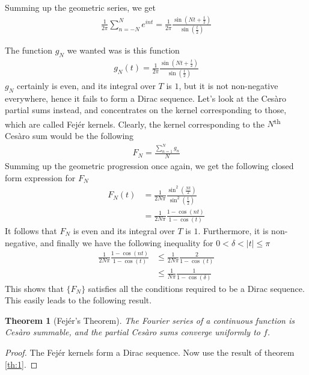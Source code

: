 \documentclass[12pt, titlepage]{article}
\newtheorem{thm}{Theorem}[section]
\theoremstyle{definition}
\begin{document}
Summing up the geometric series, we get
\begin{align*}
    \frac{1}{2\pi} \sum_{n = -N}^{N} e^{int} = \frac{1}{2\pi} \frac{\sin\left( Nt + \frac{t}{2} \right)}{\sin\left( \frac{t}{2} \right)}
\end{align*}

The function $g_N$ we wanted was is this function
\begin{align}
    g_N(t) = \frac{1}{2\pi} \frac{\sin\left( Nt + \frac{t}{2} \right)}{\sin\left( \frac{t}{2} \right)} \label{eq:5}
\end{align}
$g_N$ certainly is even, and its integral over $T$ is $1$, but it is not non-negative everywhere, hence it fails to form a Dirac sequence. Let's look at the Cesàro partial sums instead, and concentrates on the kernel corresponding to those, which are called Fejér kernels. Clearly, the kernel corresponding to the $N$\textsuperscript{th} Cesàro sum would be the following
\begin{align*}
    F_N = \frac{\sum_{n=1}^{N} g_n}{N} 
\end{align*}
Summing up the geometric progression once again, we get the following closed form expression for $F_N$
\begin{align*}
    F_N(t) &= \frac{1}{2N\pi} \frac{\sin^2 \left( \frac{Nt}{2} \right)}{\sin^2 \left( \frac{t}{2} \right)} \\
    & = \frac{1}{2N\pi} \frac{1 - \cos(nt)}{1 - \cos(t)}
\end{align*}
It follows that $F_N$ is even and its integral over $T$ is $1$. Furthermore, it is non-negative, and finally we have the following inequality for $0 < \delta < |t| \leq \pi$
\begin{align*}
    \frac{1}{2N\pi} \frac{1 - \cos(nt)}{1 - \cos(t)} &\leq \frac{1}{2N\pi} \frac{2}{1 - \cos(t)} \\
    &\leq \frac{1}{N\pi} \frac{1}{1 - \cos(\delta)}
\end{align*}
This shows that $\{F_N\}$ satisfies all the conditions required to be a Dirac sequence. This easily leads to the following result.

\begin{thm}[Fejér's Theorem] \label{th:2}
    The Fourier series of a continuous function is Cesàro summable, and the partial Cesàro sums converge uniformly to $f$.
\end{thm}

\begin{proof}
    The Fejér kernels form a Dirac sequence. Now use the result of theorem \ref{th:1}.
\end{proof}
\end{document}
